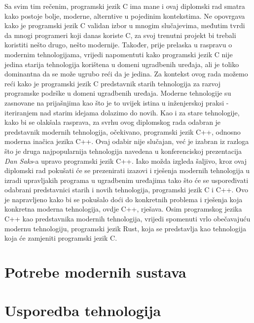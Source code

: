 Sa svim tim rečenim, programski jezik C ima mane i ovaj diplomski rad smatra kako postoje bolje, moderne, alterntive u pojedinim kontekstima. Ne opovrgava kako je programski jezik C validan izbor u mnogim slučajevima, međutim tvrdi da mnogi programeri koji danas koriste C, za svoj trenutni projekt bi trebali koristiti nešto drugo, nešto modernije. Također, prije prelaska u raspravu o modernim tehnologijama, vrijedi napomentuti kako programski jezik C nije jedina starija tehnologija korištena u domeni ugradbenih uređaja, ali je toliko dominantna da se može ugrubo reći da je jedina. Za kontekst ovog rada možemo reći kako je programski jezik C predstavnik starih tehnologija za razvoj programske podrške u domeni ugradbenih uređaja. Moderne tehnologije su zasnovane na prijašnjima kao što je to uvijek istina u inženjerskoj praksi - iteriranjem nad starim idejama dolazimo do novih. Kao i za stare tehnologije, kako bi se olakšala rasprava, za svrhu ovog diplomskog rada odabran je predstavnik modernih tehnologija, očekivano, programski jezik C++, odnosno moderna inačica jezika C++. Ovaj odabir nije slučajan, već je izabran iz razloga što je druga najpopularnija tehnologija navedena u konferenciskoj prezentacija \textit{Dan Saks}-a\cite{danSaksWritingBetterEmbeddedSoftware} upravo programski jezik C++. Iako možda izgleda šaljivo, kroz ovaj diplomski rad pokušati će se prezenirati izazovi i rješenja modernih tehnologija u izradi upravljakih programa u ugradbenim uređajima tako što će se uspoređivati odabrani predstavnici starih i novih tehnologija, programski jezik C i C++. Ovo je napravljeno kako bi se pokušalo doći do konkretnih problema i rješenja koja konkretna moderna tehnologija, ovdje C++, rješava. Osim programskog jezika C++ kao predstavnika modernih tehnologija, vrijedi spomenuti vrlo obečavajuću modernu tehnologiju, programski jezik Rust, koja se predstavlja kao tehnologija koja će zamjeniti programski jezik C. 

\section{Potrebe modernih sustava}

\section{Usporedba tehnologija}
